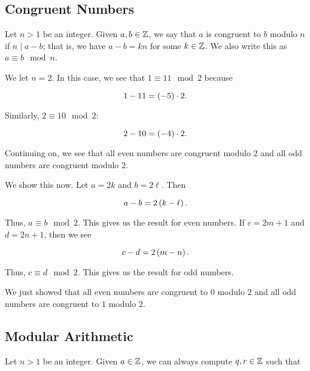 \subsection{Congruent Numbers}

Let $n>1$ be an integer.
Given $a,b\in\mathbb{Z}$, we say that $a$ is congruent to $b$ modulo $n$
if $n\mid a-b$;
that is, we have $a-b = kn$ for some $k\in\mathbb{Z}$.
We also write this as $a \equiv b \mod n$.

\begin{example}
We let $n=2$.
In this case, we see that $1 \equiv 11\mod 2$ because

\begin{equation}
    1 - 11 = \left( -5 \right)\cdot2.
\end{equation}

\noindent
Similarly, $2 \equiv 10 \mod 2$:

\begin{equation}
    2 - 10 = \left( -4 \right)\cdot2.
\end{equation}

\noindent
Continuing on, we see that all even numbers are congruent modulo $2$
and all odd numbers are congruent modulo $2$.

We show this now.
Let $a = 2k$ and $b = 2\ell$.
Then

\begin{equation}
    a - b = 2\left( k-\ell \right).
\end{equation}

\noindent
Thus, $a\equiv b \mod 2$.
This gives us the result for even numbers.
If $c = 2m+1$ and $d = 2n + 1$, then we see

\begin{equation}
    c - d = 2\left( m-n \right).
\end{equation}

\noindent
Thus, $c\equiv d \mod 2$.
This gives us the result for odd numbers.

We just showed that all even numbers are congruent to $0$ modulo $2$
and all odd numbers are congruent to $1$ modulo $2$.
\end{example}



\subsection{Modular Arithmetic}

Let $n>1$ be an integer.
Given $a\in\mathbb{Z}$, we can always compute $q, r\in\mathbb{Z}$ such that

